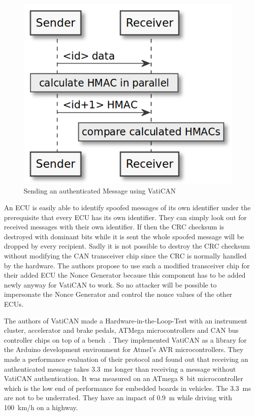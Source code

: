 \begin{figure}[h]
    \centering
    \captionsetup{justification=centering}
	\includegraphics[width=0.8\linewidth]{Figures/VatiCAN_sending_msg.png}
	\caption[]{Sending an authenticated Message using VatiCAN}
	\label{fig:vatican_sending_msg}
\end{figure}

An ECU is easily able to identify spoofed messages of its own identifier under
the prerequisite that every ECU has its own identifier. They can simply look out
for received messages with their own identifier. If then the CRC checksum is
destroyed with dominant bits while it is sent the whole spoofed message will be
dropped by every recipient. Sadly it is not possible to destroy the CRC checksum
without modifying the CAN transceiver chip since the CRC is normally handled by
the hardware. The authors propose to use such a modified transceiver chip for
their added ECU the Nonce Generator because this component has to be added newly
anyway for VatiCAN to work. So no attacker will be possible to impersonate the
Nonce Generator and control the nonce values of the other ECUs.

The authors of VatiCAN made a Hardware-in-the-Loop-Test with an instrument
cluster, accelerator and brake pedals, ATMega microcontrollers and CAN bus
controller chips on top of a bench~\cite{Nurnberger2016}. They implemented
VatiCAN as a library for the Arduino development environment for Atmel's AVR
microcontrollers. They made a performance evaluation of their protocol and found
out that receiving an authenticated message takes 3.3~ms longer than receiving a
message without VatiCAN authentication. It was measured on an ATmega 8~bit
microcontroller which is the low end of performance for embedded boards in
vehicles. The 3.3~ms are not to be underrated. They have an impact of 0.9~m
while driving with 100~km/h on a highway.


